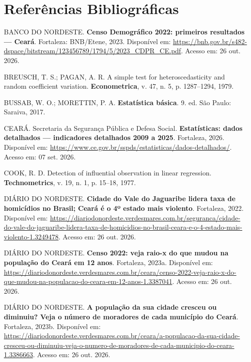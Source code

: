 \documentclass[12pt,a4paper]{article}
\begin{document}
	\newpage
	
	\section{Referências Bibliográficas}
	
	\begin{description}
		\item BANCO DO NORDESTE. \textbf{Censo Demográfico 2022: primeiros resultados --- Ceará}. Fortaleza: BNB/Etene, 2023. Disponível em: \url{https://bnb.gov.br/s482-dspace/bitstream/123456789/1794/5/2023_CDPR_CE.pdf}. Acesso em: 26 out. 2026.
		
		\item BREUSCH, T. S.; PAGAN, A. R. A simple test for heteroscedasticity and random coefficient variation. \textbf{Econometrica}, v. 47, n. 5, p. 1287--1294, 1979.
		
		\item BUSSAB, W. O.; MORETTIN, P. A. \textbf{Estatística básica}. 9. ed. São Paulo: Saraiva, 2017.
		
		\item CEARÁ. Secretaria da Segurança Pública e Defesa Social. \textbf{Estatísticas: dados detalhados --- indicadores detalhados 2009 a 2025}. Fortaleza, 2026. Disponível em: \url{https://www.ce.gov.br/sspds/estatisticas/dados-detalhados/}. Acesso em: 07 set. 2026.
		
		\item COOK, R. D. Detection of influential observation in linear regression. \textbf{Technometrics}, v. 19, n. 1, p. 15--18, 1977.
		
		\item DIÁRIO DO NORDESTE. \textbf{Cidade do Vale do Jaguaribe lidera taxa de homicídios no Brasil; Ceará é o 4º estado mais violento}. Fortaleza, 2022. Disponível em: \url{https://diariodonordeste.verdesmares.com.br/seguranca/cidade-do-vale-do-jaguaribe-lidera-taxa-de-homicidios-no-brasil-ceara-e-o-4-estado-mais-violento-1.3249478}. Acesso em: 26 out. 2026.
		
		\item DIÁRIO DO NORDESTE. \textbf{Censo 2022: veja raio-x do que mudou na população do Ceará em 12 anos}. Fortaleza, 2023a. Disponível em: \url{https://diariodonordeste.verdesmares.com.br/ceara/censo-2022-veja-raio-x-do-que-mudou-na-populacao-do-ceara-em-12-anos-1.3387041}. Acesso em: 26 out. 2026.
		
		\item DIÁRIO DO NORDESTE. \textbf{A população da sua cidade cresceu ou diminuiu? Veja o número de moradores de cada município do Ceará}. Fortaleza, 2023b. Disponível em: \url{https://diariodonordeste.verdesmares.com.br/ceara/a-populacao-da-sua-cidade-cresceu-ou-diminuiu-veja-o-numero-de-moradores-de-cada-municipio-do-ceara-1.3386663}. Acesso em: 26 out. 2026.
		

\end{description}
\end{document}
